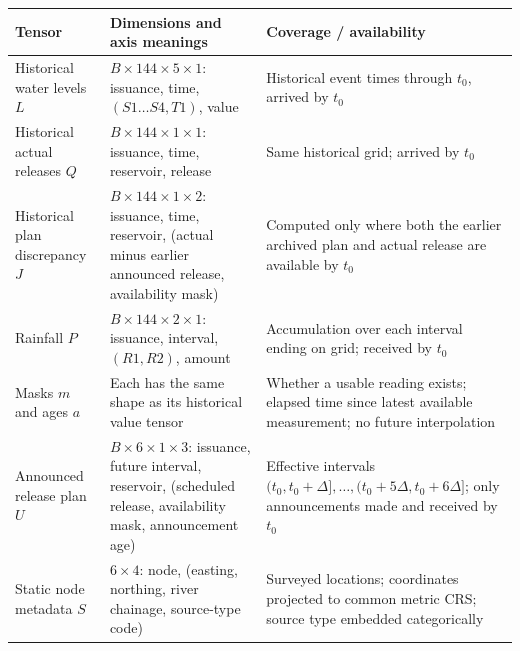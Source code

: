 \documentclass[
  10pt,
  a4paper,
]{article}
\newcounter{none} %
\begin{document}
{\def\LTcaptype{none} %
\begin{longtable}[]{@{}
  >{\raggedright\arraybackslash}p{}
  >{\raggedright\arraybackslash}p{}
  >{\raggedright\arraybackslash}p{}@{}}
\toprule\noalign{}
\begin{minipage}[b]{\linewidth}\raggedright
Tensor
\end{minipage} & \begin{minipage}[b]{\linewidth}\raggedright
Dimensions and axis meanings
\end{minipage} & \begin{minipage}[b]{\linewidth}\raggedright
Coverage / availability
\end{minipage} \\
\midrule\noalign{}
\endhead
\bottomrule\noalign{}
\endlastfoot
Historical water levels \(L\) & \(B\times144\times5\times1\): issuance,
time, \((S1\ldots S4,T1)\), value & Historical event times through
\(t_0\), arrived by \(t_0\) \\
Historical actual releases \(Q\) & \(B\times144\times1\times1\):
issuance, time, reservoir, release & Same historical grid; arrived by
\(t_0\) \\
Historical plan discrepancy \(J\) & \(B\times144\times1\times2\):
issuance, time, reservoir, (actual minus earlier announced release,
availability mask) & Computed only where both the earlier archived plan
and actual release are available by \(t_0\) \\
Rainfall \(P\) & \(B\times144\times2\times1\): issuance, interval,
\((R1,R2)\), amount & Accumulation over each interval ending on grid;
received by \(t_0\) \\
Masks \(m\) and ages \(a\) & Each has the same shape as its historical
value tensor & Whether a usable reading exists; elapsed time since
latest available measurement; no future interpolation \\
Announced release plan \(U\) & \(B\times6\times1\times3\): issuance,
future interval, reservoir, (scheduled release, availability mask,
announcement age) & Effective intervals
\((t_0,t_0+\Delta],\ldots,(t_0+5\Delta,t_0+6\Delta]\); only
announcements made and received by \(t_0\) \\
Static node metadata \(S\) & \(6\times4\): node, (easting, northing,
river chainage, source-type code) & Surveyed locations; coordinates
projected to common metric CRS; source type embedded categorically \\

\end{longtable}}
\end{document}
